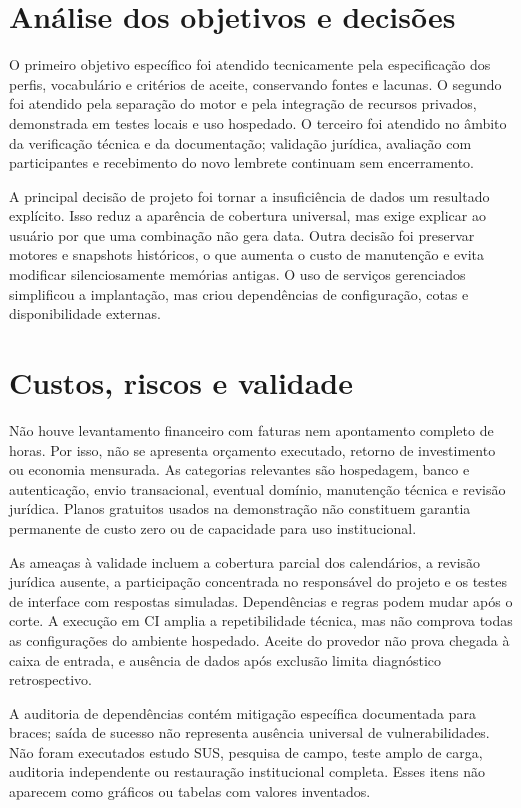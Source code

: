 \section{Análise dos objetivos e decisões}
\label{section-6-5}
O primeiro objetivo específico foi atendido tecnicamente pela especificação dos perfis, vocabulário e critérios de aceite, conservando fontes e lacunas. O segundo foi atendido pela separação do motor e pela integração de recursos privados, demonstrada em testes locais e uso hospedado. O terceiro foi atendido no âmbito da verificação técnica e da documentação; validação jurídica, avaliação com participantes e recebimento do novo lembrete continuam sem encerramento.

A principal decisão de projeto foi tornar a insuficiência de dados um resultado explícito. Isso reduz a aparência de cobertura universal, mas exige explicar ao usuário por que uma combinação não gera data. Outra decisão foi preservar motores e snapshots históricos, o que aumenta o custo de manutenção e evita modificar silenciosamente memórias antigas. O uso de serviços gerenciados simplificou a implantação, mas criou dependências de configuração, cotas e disponibilidade externas.

\section{Custos, riscos e validade}
\label{section-6-6}
Não houve levantamento financeiro com faturas nem apontamento completo de horas. Por isso, não se apresenta orçamento executado, retorno de investimento ou economia mensurada. As categorias relevantes são hospedagem, banco e autenticação, envio transacional, eventual domínio, manutenção técnica e revisão jurídica. Planos gratuitos usados na demonstração não constituem garantia permanente de custo zero ou de capacidade para uso institucional.

As ameaças à validade incluem a cobertura parcial dos calendários, a revisão jurídica ausente, a participação concentrada no responsável do projeto e os testes de interface com respostas simuladas. Dependências e regras podem mudar após o corte. A execução em CI amplia a repetibilidade técnica, mas não comprova todas as configurações do ambiente hospedado. Aceite do provedor não prova chegada à caixa de entrada, e ausência de dados após exclusão limita diagnóstico retrospectivo.

A auditoria de dependências contém mitigação específica documentada para braces; saída de sucesso não representa ausência universal de vulnerabilidades. Não foram executados estudo SUS, pesquisa de campo, teste amplo de carga, auditoria independente ou restauração institucional completa. Esses itens não aparecem como gráficos ou tabelas com valores inventados.


